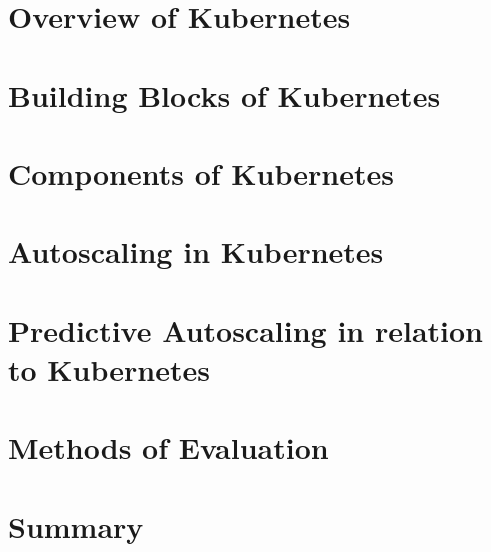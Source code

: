 \section{Overview of Kubernetes}



\section{Building Blocks of Kubernetes}



\section{Components of Kubernetes}



\section{Autoscaling in Kubernetes}



\section{Predictive Autoscaling in relation to Kubernetes}



\section{Methods of Evaluation}



\section{Summary}


